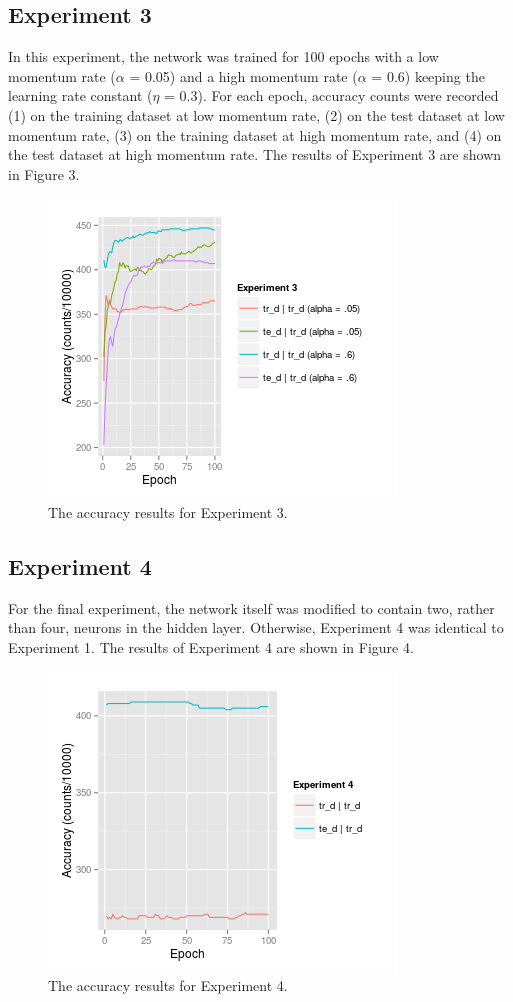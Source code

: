 \documentclass[12pt]{article}
\begin{document}
\subsection{Experiment 3}
In this experiment, the network was trained for 100 epochs with a low momentum rate ($\alpha$ = 0.05) and a high momentum rate ($\alpha$ = 0.6) keeping the learning rate constant ($\eta$ = 0.3). For each epoch, accuracy counts were recorded (1) on the training dataset at low momentum rate, (2) on the test dataset at low momentum rate, (3) on the training dataset at high momentum rate, and (4) on the test dataset at high momentum rate. The results of Experiment 3 are shown in Figure 3.
\begin{figure}
  \begin{center}
    \includegraphics{Rplot3.png}
    \caption{The accuracy results for Experiment 3.}
  \end{center}
\end{figure}

\subsection{Experiment 4}
For the final experiment, the network itself was modified to contain two, rather than four, neurons in the hidden layer. Otherwise, Experiment 4 was identical to Experiment 1. The results of Experiment 4 are shown in Figure 4. 
\begin{figure}
  \begin{center}
    \includegraphics{Rplot4.png}
    \caption{The accuracy results for Experiment 4.}
  \end{center}
\end{figure}
\end{document}
